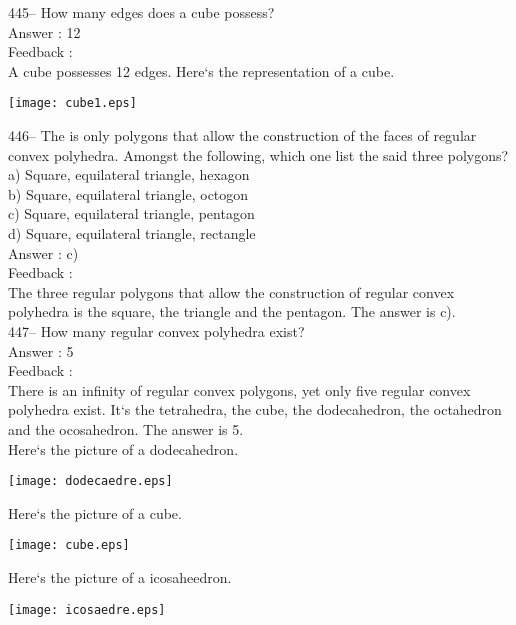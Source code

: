﻿\documentclass[letterpaper, 12pt]{article}
\begin{document}
445-- How many edges does a cube possess?\\

Answer : 12\\

Feedback : \\
A cube possesses 12 edges. Here`s the representation of a cube.\\
    \begin{center}
    \texttt{[image: cube1.eps]}
    \end{center}



446-- The is only polygons that allow the construction of the faces of regular convex polyhedra. 
Amongst the following, which one list the said three polygons?\\
a) Square, equilateral triangle, hexagon\\
b) Square, equilateral triangle, octogon\\
c) Square, equilateral triangle, pentagon\\
d) Square, equilateral triangle, rectangle\\


Answer : c)\\

Feedback : \\
The three regular polygons that allow the construction of regular convex polyhedra is the square, the triangle and the pentagon.  The answer is c).\\

447-- How many regular convex polyhedra exist?\\

Answer : 5\\

Feedback : \\
There is an infinity of regular convex polygons, yet only five regular convex polyhedra exist. It`s the tetrahedra, the cube, the dodecahedron, the octahedron and the ocosahedron.
The answer is 5.\\
Here`s the picture of a dodecahedron.\\
    \begin{center}
    \texttt{[image: dodecaedre.eps]}
    \end{center}
Here`s the picture of a cube.\\
    \begin{center}
    \texttt{[image: cube.eps]}
    \end{center}
Here`s the picture of a icosaheedron.\\
    \begin{center}
    \texttt{[image: icosaedre.eps]}
    \end{center}
\end{document}
